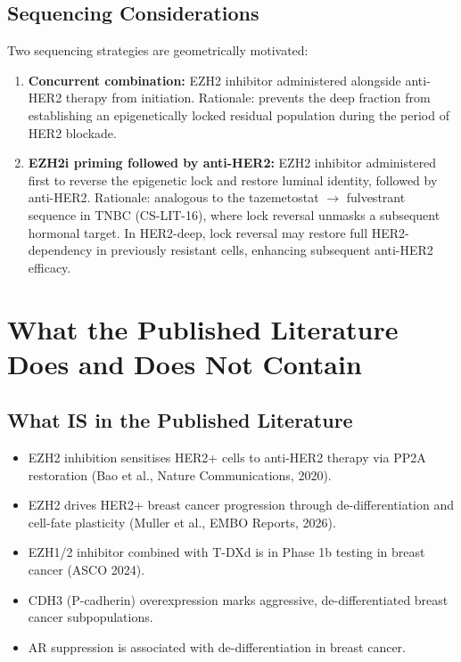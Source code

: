 \documentclass[12pt, a4paper]{article}
\begin{document}
\subsection{Sequencing Considerations}

Two sequencing strategies are geometrically
motivated:

\begin{enumerate}
    \item \textbf{Concurrent combination:}
    EZH2 inhibitor administered alongside
    anti-HER2 therapy from initiation.
    Rationale: prevents the deep fraction
    from establishing an epigenetically
    locked residual population during
    the period of HER2 blockade.

    \item \textbf{EZH2i priming followed
    by anti-HER2:} EZH2 inhibitor
    administered first to reverse the
    epigenetic lock and restore luminal
    identity, followed by anti-HER2.
    Rationale: analogous to the
    tazemetostat $\rightarrow$ fulvestrant
    sequence in TNBC (CS-LIT-16), where
    lock reversal unmasks a subsequent
    hormonal target. In HER2-deep, lock
    reversal may restore full
    HER2-dependency in previously
    resistant cells, enhancing subsequent
    anti-HER2 efficacy.
\end{enumerate}

\section{What the Published Literature Does and
Does Not Contain}

\subsection{What IS in the Published Literature}

\begin{itemize}
    \item EZH2 inhibition sensitises
    HER2+ cells to anti-HER2 therapy
    via PP2A restoration (Bao et al.,
    Nature Communications, 2020).
    \item EZH2 drives HER2+ breast cancer
    progression through de-differentiation
    and cell-fate plasticity (Muller et al.,
    EMBO Reports, 2026).
    \item EZH1/2 inhibitor combined with
    T-DXd is in Phase 1b testing in
    breast cancer (ASCO 2024).
    \item CDH3 (P-cadherin) overexpression
    marks aggressive, de-differentiated
    breast cancer subpopulations.
    \item AR suppression is associated with
    de-differentiation in breast cancer.
\end{itemize}
\end{document}
